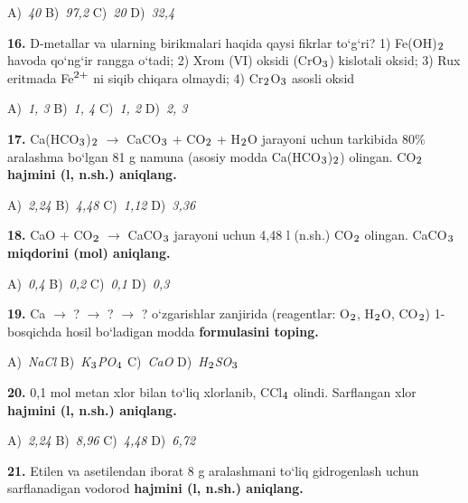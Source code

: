 \documentclass[11pt,a4paper]{article}
\renewcommand{\textsubscript}[1]{\ensuremath{_{\text{\fontsize{8}{8}\selectfont #1}}}}
\renewcommand{\textsuperscript}[1]{\ensuremath{^{\text{\fontsize{8}{8}\selectfont #1}}}}
\begin{document}
\begin{multicols}{2}
\noindent A)~\textsl{40} \hfill B)~\textsl{97,2} \hfill C)~\textsl{20} \hfill D)~\textsl{32,4}\par
\vspace{4pt}
\noindent\textbf{16.} D-metallar va ularning birikmalari haqida qaysi fikrlar to`g`ri? 1) Fe(OH)\textsubscript{2} havoda qo`ng`ir rangga o`tadi; 2) Xrom (VI) oksidi (CrO\textsubscript{3}) kislotali oksid; 3) Rux eritmada Fe\textsuperscript{2+} ni siqib chiqara olmaydi; 4) Cr\textsubscript{2}O\textsubscript{3} asosli oksid

\noindent A)~\textsl{1, 3} \hfill B)~\textsl{1, 4} \hfill C)~\textsl{1, 2} \hfill D)~\textsl{2, 3}\par
\vspace{4pt}
\noindent\textbf{17.} Ca(HCO\textsubscript{3})\textsubscript{2} $\to$ CaCO\textsubscript{3} + CO\textsubscript{2} + H\textsubscript{2}O jarayoni uchun tarkibida 80\% aralashma bo`lgan 81 g namuna (asosiy modda Ca(HCO\textsubscript{3})\textsubscript{2}) olingan. CO\textsubscript{2} \textbf{hajmini (l, n.sh.) aniqlang.}

\noindent A)~\textsl{2,24} \hfill B)~\textsl{4,48} \hfill C)~\textsl{1,12} \hfill D)~\textsl{3,36}\par
\vspace{4pt}
\noindent\textbf{18.} CaO + CO\textsubscript{2} $\to$ CaCO\textsubscript{3} jarayoni uchun 4,48 l (n.sh.) CO\textsubscript{2} olingan. CaCO\textsubscript{3} \textbf{miqdorini (mol) aniqlang.}

\noindent A)~\textsl{0,4} \hfill B)~\textsl{0,2} \hfill C)~\textsl{0,1} \hfill D)~\textsl{0,3}\par
\vspace{4pt}
\noindent\textbf{19.} Ca $\to$ ? $\to$ ? $\to$ ? o`zgarishlar zanjirida (reagentlar: O\textsubscript{2}, H\textsubscript{2}O, CO\textsubscript{2}) 1-bosqichda hosil bo`ladigan modda \textbf{formulasini toping.}

\noindent A)~\textsl{NaCl} \hfill B)~\textsl{K\textsubscript{3}PO\textsubscript{4}} \hfill C)~\textsl{CaO} \hfill D)~\textsl{H\textsubscript{2}SO\textsubscript{3}}\par
\vspace{4pt}
\noindent\textbf{20.} 0,1 mol metan xlor bilan to`liq xlorlanib, CCl\textsubscript{4} olindi. Sarflangan xlor \textbf{hajmini (l, n.sh.) aniqlang.}

\noindent A)~\textsl{2,24} \hfill B)~\textsl{8,96} \hfill C)~\textsl{4,48} \hfill D)~\textsl{6,72}\par
\vspace{4pt}
\noindent\textbf{21.} Etilen va asetilendan iborat 8 g aralashmani to`liq gidrogenlash uchun sarflanadigan vodorod \textbf{hajmini (l, n.sh.) aniqlang.}


\end{multicols}
\end{document}
